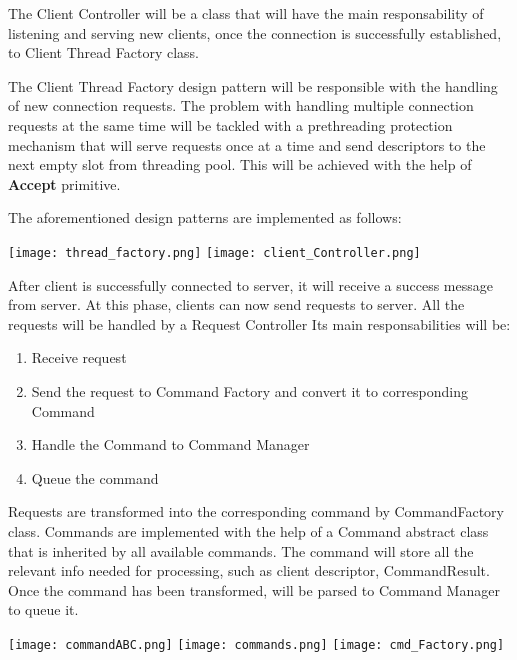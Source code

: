 \documentclass[runningheads]{llncs}
\begin{document}
The Client Controller will be a class that will have the main responsability of listening and serving new clients, once the connection is successfully established, to Client Thread Factory class.

The Client Thread Factory design pattern will be responsible with the handling of new connection requests. The problem with handling multiple connection requests at the same time will be tackled with a prethreading protection mechanism that will serve requests once at a time and send descriptors to the next empty slot from threading pool. This will be achieved with the help of \textbf{Accept} primitive.

The aforementioned design patterns are implemented as follows:

\vspace{5mm}

\hspace*{-0.3in}
\texttt{[image: thread\_factory.png]}
\texttt{[image: client\_Controller.png]}

\vspace{5mm}



After client is successfully connected to server, it will receive a success message from server. At this phase, clients can now send requests to server. All the requests will be handled by a Request Controller Its main responsabilities will be:


\begin{enumerate}
    \item Receive request
    \item Send the request to Command Factory and convert it to corresponding Command
    \item Handle the Command to Command Manager
    \item Queue the command
\end{enumerate}

Requests are transformed into the corresponding command by CommandFactory class. Commands are implemented with the help of a Command abstract class that is inherited by all available commands. The command will store all the relevant info needed for processing, such as client descriptor, CommandResult. Once the command has been transformed, will be parsed to Command Manager to queue it.


\vspace{5mm}

\hspace*{-1.3in}
\texttt{[image: commandABC.png]}
\texttt{[image: commands.png]}
\texttt{[image: cmd\_Factory.png]}
\end{document}
